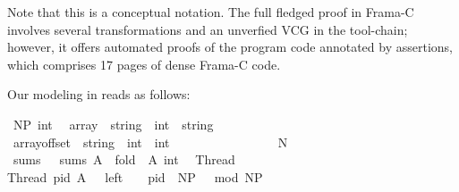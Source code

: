 \begin{isabellebody}
\begin{isamarkuptext}
Note that this is a conceptual notation. The full fledged proof in Frama-C
involves several transformations and an unverfied VCG in the tool-chain; however, it
offers automated proofs of the  program code annotated by assertions, which 
comprises 17 pages of dense Frama-C code. 

Our modeling in  reads as follows:%
\end{isamarkuptext}\isamarkuptrue%
\isamarkupfalse%
\ NP{\isacharcolon}{\kern0pt}{\isacharcolon}{\kern0pt}\ int\ %
\isanewline
\isanewline
{}\isamarkupfalse%
\ array\ {\isacharcolon}{\kern0pt}{\isacharcolon}{\kern0pt}\ {\isacartoucheopen}string\ {\isasymtimes}\ int\ {\isasymRightarrow}\ string{\isacartoucheclose}\ \isanewline
\ \ \ \ \ \ \ \ \ \ \ \ \ \ \ \ %
\isanewline
{}\isamarkupfalse%
\ array{\isacharunderscore}{\kern0pt}offset\ {\isacharcolon}{\kern0pt}{\isacharcolon}{\kern0pt}\ {\isacartoucheopen}string\ {\isasymtimes}\ int\ {\isasymRightarrow}\ int{\isacartoucheclose}\isanewline
\ \ \ \ \ \ \ \ \ \ \ \ \ \ \ \ %
\isanewline
\isanewline
{}\isamarkupfalse%
{\isacartoucheopen}{\isacharbrackleft}{\kern0pt}{}{\isachardot}{\kern0pt}{\isachardot}{\kern0pt}N{\isacharbrackright}{\kern0pt}{\isacartoucheclose}\isanewline
{}\isamarkupfalse%
\ sums\ \ \ {\isacartoucheopen}sums\ A\ {\isacharequal}{\kern0pt}\ fold\ {\isacharparenleft}{\kern0pt}{\isacharplus}{\kern0pt}{\isacharparenright}{\kern0pt}\ A\ {\isacharparenleft}{\kern0pt}{}{\isacharcolon}{\kern0pt}{\isacharcolon}{\kern0pt}int{\isacharparenright}{\kern0pt}\ {\isacartoucheclose}\isanewline
\isanewline
{}\isamarkupfalse%
\ Thread{}\ \isanewline
{\isacartoucheopen}Thread{}\ pid\ A\ {\isacharequal}{\kern0pt}\ {\isacharparenleft}{\kern0pt}\ {\isacharprime}{\kern0pt}{\isacharprime}{\kern0pt}left{\isacharprime}{\kern0pt}{\isacharprime}{\kern0pt}\ \ {\isacharcolon}{\kern0pt}{\isacharequal}{\kern0pt}\ {\isacharparenleft}{\kern0pt}{\isasymlambda}{\isasymsigma}{\isachardot}{\kern0pt}\ {\isacharparenleft}{\kern0pt}pid\ {\isacharplus}{\kern0pt}\ NP\ {\isacharminus}{\kern0pt}\ {}{\isacharparenright}{\kern0pt}\ mod\ NP{\isacharparenright}{\kern0pt}{\isacharparenright}{\kern0pt}\ {\isacharsemicolon}{\kern0pt}\isanewline

\end{isabellebody}
